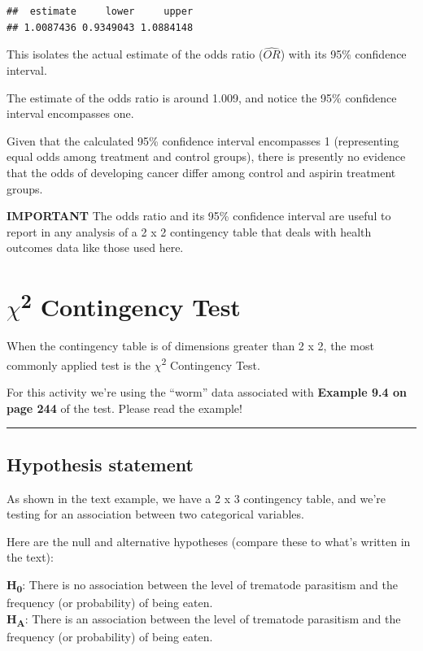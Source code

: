 \documentclass[
]{book}
\begin{document}
\begin{verbatim}
##  estimate     lower     upper 
## 1.0087436 0.9349043 1.0884148
\end{verbatim}

This isolates the actual estimate of the odds ratio (\(\hat{OR}\)) with its 95\% confidence interval.

The estimate of the odds ratio is around 1.009, and notice the 95\% confidence interval encompasses one.

Given that the calculated 95\% confidence interval encompasses 1 (representing equal odds among treatment and control groups), there is presently no evidence that the odds of developing cancer differ among control and aspirin treatment groups.

\textbf{IMPORTANT }
The odds ratio and its 95\% confidence interval are useful to report in any analysis of a 2 x 2 contingency table that deals with health outcomes data like those used here.

\section{\texorpdfstring{\(\chi\)\textsuperscript{2} Contingency Test}{\textbackslash chi2 Contingency Test}}\label{chisquare}

When the contingency table is of dimensions greater than 2 x 2, the most commonly applied test is the \(\chi\)\textsuperscript{2} Contingency Test.

For this activity we're using the ``worm'' data associated with \textbf{Example 9.4 on page 244} of the test. Please read the example!

\begin{center}\rule{0.5\linewidth}{0.5pt}\end{center}

\subsection{Hypothesis statement}\label{chihyp}

As shown in the text example, we have a 2 x 3 contingency table, and we're testing for an association between two categorical variables.

Here are the null and alternative hypotheses (compare these to what's written in the text):

\textbf{H\textsubscript{0}}: There is no association between the level of trematode parasitism and the frequency (or probability) of being eaten.\\
\textbf{H\textsubscript{A}}: There is an association between the level of trematode parasitism and the frequency (or probability) of being eaten.
\end{document}
